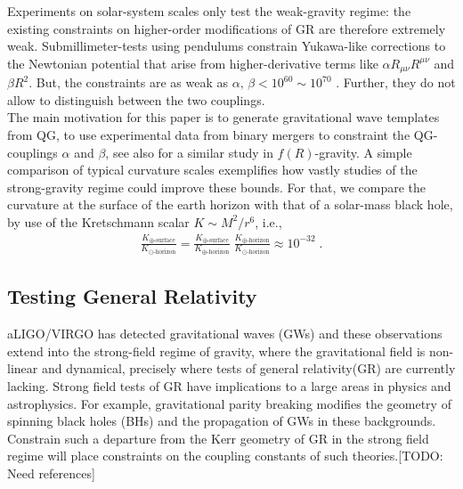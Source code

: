 \documentclass[a4paper,oneside,openany,11pt]{memoir}
\numberwithin{equation}{section} %
\newcommand{\TODO}[1]{{\color{red}[}{\color{red}TODO:} {\color{blue}#1}{\color{red}]}}
\begin{document}
Experiments on solar-system scales only test the weak-gravity regime:
the existing constraints on higher-order modifications of GR are
therefore extremely weak. Submillimeter-tests using pendulums
constrain Yukawa-like corrections to the Newtonian potential that
arise from higher-derivative terms like $\alpha  R_{\mu\nu}R^{\mu\nu}$
and $\beta  R^2$. But, the constraints are as weak as $\alpha,\,\beta
< 10^{60}\sim 10^{70}$ \cite{Hoyle:2004cw, Kapner:2006si,
Calmet:2017rxl}. Further, they do not allow to distinguish between
the two couplings.
\\
The main motivation for this paper is to generate gravitational
wave templates from QG, to use experimental data from binary mergers
to constraint the QG-couplings $\alpha$ and $\beta$, see also
\cite{Berry:2011pb, Cao:2013osa} for a similar study in $f(R)$-gravity.
A simple comparison of typical curvature scales exemplifies how
vastly studies of the strong-gravity regime could improve these
bounds. For that, we compare the curvature at the surface of the
earth horizon with that of a solar-mass black hole, by use of the
Kretschmann scalar $K\sim M^2/r^6$, i.e.,
\begin{align}
	\frac{K_{\oplus\text{-surface}}}{K_{\odot\text{-horizon}}} = \frac{K_{\oplus\text{-surface}}}{K_{\oplus\text{-horizon}}}\;\frac{K_{\oplus\text{-horizon}}}{K_{\odot\text{-horizon}}} \approx 10^{-32}\;.
\end{align}

\subsection{Testing General Relativity}
aLIGO/VIRGO has detected gravitational waves (GWs) and these observations extend into the strong-field regime of gravity,
where the gravitational field is non-linear and dynamical, precisely where tests of general relativity(GR) are currently lacking. 
Strong field tests of GR have implications to a large areas in physics and astrophysics. For example, 
gravitational parity breaking modifies the geometry of spinning black holes (BHs) and the propagation of GWs in 
these backgrounds. Constrain such a departure from the Kerr geometry of GR in the strong field regime will place
constraints on the coupling constants of such theories.\TODO{Need references}
\end{document}
